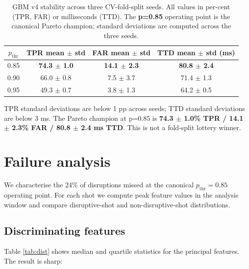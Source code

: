 \documentclass[11pt,letterpaper]{article}
\begin{document}
\begin{table}[h]
\centering
\caption{GBM v4 stability across three CV-fold-split seeds. All values
in per-cent (TPR, FAR) or milliseconds (TTD). The \textbf{p=0.85}
operating point is the canonical Pareto champion; standard deviations
are computed across the three seeds.}
\label{tab:stability}
\begin{tabular}{c c c c}
\toprule
$p_{\mathrm{thr}}$ & TPR mean $\pm$ std & FAR mean $\pm$ std & TTD mean $\pm$ std (ms) \\
\midrule
0.85 & \textbf{74.3 $\pm$ 1.0} & \textbf{14.1 $\pm$ 2.3} & \textbf{80.8 $\pm$ 2.4} \\
0.90 & 66.0 $\pm$ 0.8 & 7.5 $\pm$ 3.7 & 71.4 $\pm$ 1.3 \\
0.95 & 49.3 $\pm$ 0.7 & 3.8 $\pm$ 1.3 & 64.2 $\pm$ 0.5 \\
\bottomrule
\end{tabular}
\end{table}

TPR standard deviations are below 1 pp across seeds; TTD standard
deviations are below 3 ms. The Pareto champion at p=0.85 is
\textbf{74.3 $\pm$ 1.0\% TPR / 14.1 $\pm$ 2.3\% FAR / 80.8 $\pm$ 2.4 ms
TTD}. This is not a fold-split lottery winner.

\section{Failure analysis}\label{sec:failures}

We characterise the 24\% of disruptions missed at the canonical
$p_{\mathrm{thr}} = 0.85$ operating point. For each shot we compute peak
feature values in the analysis window and compare disruptive-shot and
non-disruptive-shot distributions.

\subsection{Discriminating features}

Table \ref{tab:dist} shows median and quartile statistics for the
principal features. The result is sharp:
\end{document}
